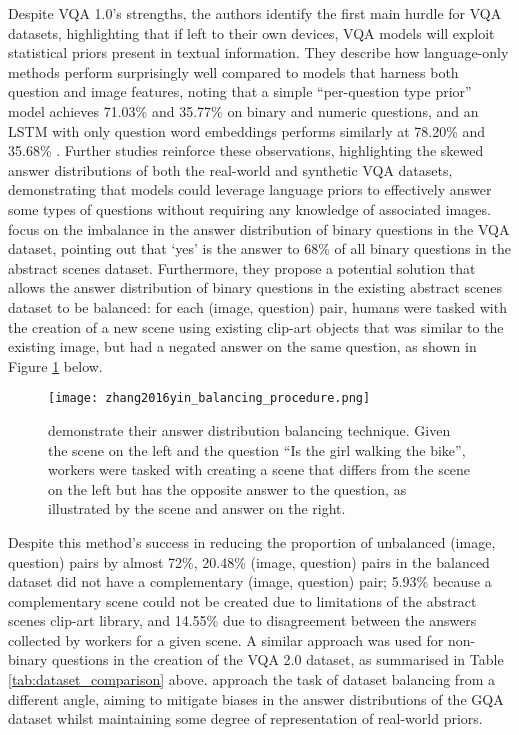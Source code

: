 Despite VQA 1.0's strengths, the authors identify the first main hurdle for VQA datasets, highlighting that if left to their own devices, VQA models will exploit statistical priors present in textual information. They describe how language-only methods perform surprisingly well compared to models that harness both question and image features, noting that a simple ``per-question type prior'' model achieves 71.03\% and 35.77\% on binary and numeric questions, and an LSTM with only question word embeddings performs similarly at 78.20\% and 35.68\%  \cite{antol2015vqa}. Further studies \cite{goyal2017making, zhang2016yin} reinforce these observations, highlighting the skewed answer distributions of both the real-world and synthetic VQA datasets, demonstrating that models could leverage language priors to effectively answer some types of questions without requiring any knowledge of associated images. \citeauthor{zhang2016yin} focus on the imbalance in the answer distribution of binary questions in the VQA dataset, pointing out that `yes' is the answer to 68\% of all binary questions in the abstract scenes dataset. Furthermore, they propose a potential solution that allows the answer distribution of binary questions in the existing abstract scenes dataset to be balanced: for each (image, question) pair, humans were tasked with the creation of a new scene using existing clip-art objects \cite{zitnick2013bringing} that was similar to the existing image, but had a negated answer on the same question, as shown in Figure \ref{fig:zhang2016yin_balancing_procedure} below.

\begin{figure}[H]
    \centering
    \texttt{[image: zhang2016yin\_balancing\_procedure.png]}
    \caption{\citeauthor{zhang2016yin} demonstrate their answer distribution balancing technique. Given the scene on the left and the question ``Is the girl walking the bike'', workers were tasked with creating a scene that differs from the scene on the left but has the opposite answer to the question, as illustrated by the scene and answer on the right.}
    \label{fig:zhang2016yin_balancing_procedure}
\end{figure}

Despite this method's success in reducing the proportion of unbalanced (image, question) pairs by almost 72\%, 20.48\% (image, question) pairs in the balanced dataset did not have a complementary (image, question) pair; 5.93\% because a complementary scene could not be created due to limitations of the abstract scenes clip-art library, and 14.55\% due to disagreement between the answers collected by workers for a given scene. A similar approach was used for non-binary questions in the creation of the VQA 2.0 dataset, as summarised in Table \ref{tab:dataset_comparison} above. \citeauthor{hudson2019gqa} approach the task of dataset balancing from a different angle, aiming to mitigate biases in the answer distributions of the GQA dataset whilst maintaining some degree of representation of real-world priors.

